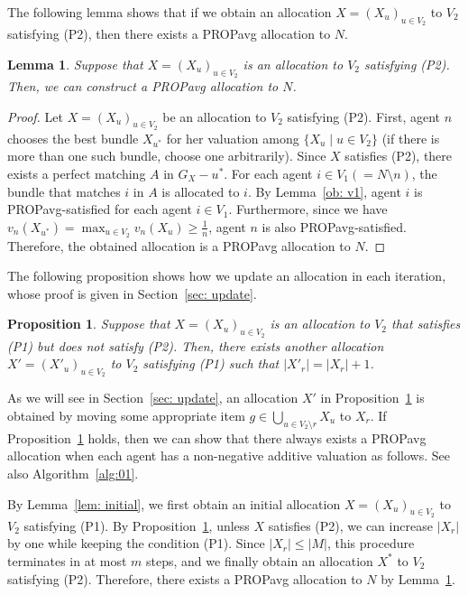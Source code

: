 \documentclass[11pt]{article}
\newtheorem{lemma}[theorem]{Lemma}
\newtheorem{proposition}[theorem]{Proposition}
\newcommand{\PROPavg}{\textsf{PROPavg}\xspace}
\begin{document}
The following lemma shows that if we obtain an allocation ${X}=(X_u)_{u \in V_2}$ to $V_2$ satisfying (P2), then there exists a \PROPavg allocation to $N$. 
\begin{lemma}\label{lem: termination}
Suppose that ${X}=(X_u)_{u \in V_2}$ is an allocation to $V_2$ satisfying (P2). 
Then, we can construct a \PROPavg allocation to $N$.
\end{lemma}
\begin{proof}
Let ${X}=(X_u)_{u \in V_2}$ be an allocation to $V_2$ satisfying (P2).
First, agent $n$ chooses the best bundle $X_{u^*}$ for her valuation among $\{X_u \mid u \in V_2 \}$ (if there is more than one such bundle, choose one arbitrarily).
Since $X$ satisfies (P2), there exists a perfect matching $A$ in $G_X - {u^*}$. 
For each agent $i\in V_1 (= N \setminus n)$, the bundle that matches $i$ in $A$ is allocated to $i$.
By Lemma~\ref{ob: v1}, agent $i$ is \PROPavg-satisfied for each agent $i\in V_1$.
Furthermore, since we have $v_n(X_{u^*}) = \max_{u\in V_2} v_n(X_u) \ge \frac{1}{n}$, agent $n$ is also \PROPavg-satisfied.
Therefore, the obtained allocation is a \PROPavg allocation to $N$.
\end{proof}

The following proposition shows how we update an allocation in each iteration, whose proof is given in Section~\ref{sec: update}. 

\begin{proposition}\label{thm: update}
Suppose that $X=(X_u)_{u \in V_2}$ is an allocation to $V_2$ that satisfies (P1) but does not satisfy (P2).
Then, there exists another allocation $X'=(X'_u)_{u \in V_2}$ to $V_2$ satisfying (P1) such that $|X'_{r}|=|X_{r}|+1$. 
\end{proposition}
As we will see in Section~\ref{sec: update}, an allocation $X'$ in Proposition~\ref{thm: update} is obtained by moving some appropriate item $g \in \bigcup_{u \in V_2 \setminus r} X_u$ to $X_r$.
If Proposition~\ref{thm: update} holds, then we can show that there always exists a \PROPavg allocation when each agent has a non-negative additive valuation as follows. See also Algorithm~\ref{alg:01}. 

By Lemma~\ref{lem: initial}, we first obtain an initial allocation $X=(X_u)_{u \in V_2}$ to $V_2$ satisfying (P1). 
By Proposition~\ref{thm: update}, unless $X$ satisfies (P2), we can increase $|X_r|$ by one while keeping the condition (P1).
Since $|X_r|\le |M|$, this procedure terminates in at most $m$ steps, and we finally obtain an allocation ${X}^*$ to $V_2$ satisfying (P2).
Therefore, there exists a \PROPavg allocation to $N$ by Lemma~\ref{lem: termination}.
\end{document}
